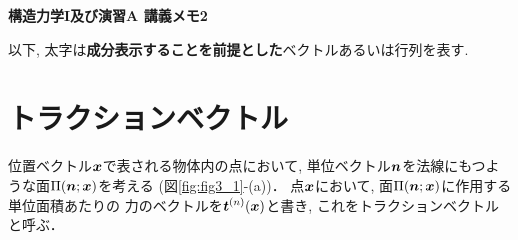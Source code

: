 \documentclass[10pt,a4j]{jarticle}
\newlength{\minitwocolumn}
\begin{document}
\newcommand{\fat}[1]{\mbox{\boldmath $#1$}}
\newcommand{\D}{\partial}
\newcommand{\w}{\omega}
\newcommand{\ga}{\alpha}
\newcommand{\gb}{\beta}
\newcommand{\gx}{\xi}
\newcommand{\gz}{\zeta}
\newcommand{\vhat}[1]{\hat{\fat{#1}}}
\newcommand{\spc}{\vspace{0.7\baselineskip}}
\newcommand{\halfspc}{\vspace{0.3\baselineskip}}

\newcommand{\twofig}[2]
 {
   \begin{figure}
     \begin{minipage}[t]{\minitwocolumn}
         \begin{center}   #1
         \end{center}
     \end{minipage}
         \hspace{\columnsep}
     \begin{minipage}[t]{\minitwocolumn}
         \begin{center} #2
         \end{center}
     \end{minipage}
   \end{figure}
 }
\begin{center}
	{\Large \bf 構造力学I及び演習A 講義メモ2} \\
\end{center}
以下, 太字は{\bf 成分表示することを前提とした}ベクトルあるいは行列を表す.
\section{トラクションベクトル}
位置ベクトル$\fat{x}$で表される物体内の点において, 
単位ベクトル$\fat{n}$を法線にもつような面$\Pi(\fat{n};\fat{x})$を考える
(図\ref{fig:fig3_1}-(a))．
点$\fat{x}$において, 面$\Pi(\fat{n};\fat{x})$に作用する単位面積あたりの
力のベクトルを$\fat{t}^{(n)}(\fat{x})$と書き, これをトラクションベクトル
と呼ぶ．
\end{document}

